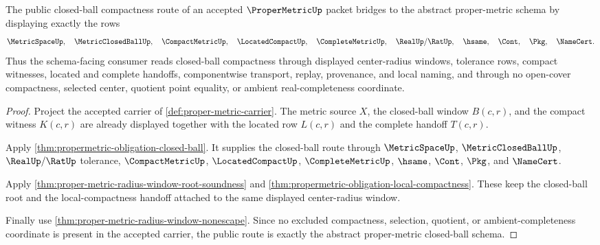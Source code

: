 \begin{theorem}
\label{thm:propermetric-bridge-closed-ball-schema}
The public closed-ball compactness route of an accepted $\ProperMetricUp$ packet bridges to the abstract proper-metric schema by displaying exactly the rows
$$
\MetricSpaceUp,\quad
\MetricClosedBallUp,\quad
\CompactMetricUp,\quad
\LocatedCompactUp,\quad
\CompleteMetricUp,\quad
\RealUp/\RatUp,\quad
\hsame,\quad
\Cont,\quad
\Pkg,\quad
\NameCert .
$$
Thus the schema-facing consumer reads closed-ball compactness through displayed center-radius windows, tolerance rows, compact witnesses, located and complete handoffs, componentwise transport, replay, provenance, and local naming, and through no open-cover compactness, selected center, quotient point equality, or ambient real-completeness coordinate.
\end{theorem}
\begin{proof}
Project the accepted carrier of \autoref{def:proper-metric-carrier}. The metric source $X$, the closed-ball window $B(c,r)$, and the compact witness $K(c,r)$ are already displayed together with the located row $L(c,r)$ and the complete handoff $T(c,r)$.

Apply \autoref{thm:propermetric-obligation-closed-ball}. It supplies the closed-ball route through $\MetricSpaceUp$, $\MetricClosedBallUp$, $\RealUp/\RatUp$ tolerance, $\CompactMetricUp$, $\LocatedCompactUp$, $\CompleteMetricUp$, $\hsame$, $\Cont$, $\Pkg$, and $\NameCert$.

Apply \autoref{thm:proper-metric-radius-window-root-soundness} and \autoref{thm:propermetric-obligation-local-compactness}. These keep the closed-ball root and the local-compactness handoff attached to the same displayed center-radius window.

Finally use \autoref{thm:proper-metric-radius-window-nonescape}. Since no excluded compactness, selection, quotient, or ambient-completeness coordinate is present in the accepted carrier, the public route is exactly the abstract proper-metric closed-ball schema.
\end{proof}


